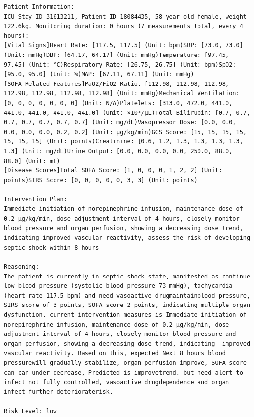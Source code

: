 \documentclass{article}
\begin{document}
\begin{lstlisting}[caption={Result for Patient 31613211}, label={lst:31613211}]
Patient Information:
ICU Stay ID 31613211, Patient ID 18084435, 58-year-old female, weight 122.6kg. Monitoring duration: 0 hours (7 measurements total, every 4 hours):
[Vital Signs]Heart Rate: [117.5, 117.5] (Unit: bpm)SBP: [73.0, 73.0] (Unit: mmHg)DBP: [64.17, 64.17] (Unit: mmHg)Temperature: [97.45, 97.45] (Unit: °C)Respiratory Rate: [26.75, 26.75] (Unit: bpm)SpO2: [95.0, 95.0] (Unit: %)MAP: [67.11, 67.11] (Unit: mmHg)
[SOFA Related Features]PaO2/FiO2 Ratio: [112.98, 112.98, 112.98, 112.98, 112.98, 112.98, 112.98] (Unit: mmHg)Mechanical Ventilation: [0, 0, 0, 0, 0, 0, 0] (Unit: N/A)Platelets: [313.0, 472.0, 441.0, 441.0, 441.0, 441.0, 441.0] (Unit: ×10³/μL)Total Bilirubin: [0.7, 0.7, 0.7, 0.7, 0.7, 0.7, 0.7] (Unit: mg/dL)Vasopressor Dose: [0.0, 0.0, 0.0, 0.0, 0.0, 0.2, 0.2] (Unit: μg/kg/min)GCS Score: [15, 15, 15, 15, 15, 15, 15] (Unit: points)Creatinine: [0.6, 1.2, 1.3, 1.3, 1.3, 1.3, 1.3] (Unit: mg/dL)Urine Output: [0.0, 0.0, 0.0, 0.0, 250.0, 88.0, 88.0] (Unit: mL)
[Disease Scores]Total SOFA Score: [1, 0, 0, 0, 1, 2, 2] (Unit: points)SIRS Score: [0, 0, 0, 0, 0, 3, 3] (Unit: points)

Intervention Plan:
Immediate initiation of norepinephrine infusion, maintenance dose of 0.2 μg/kg/min, dose adjustment interval of 4 hours, closely monitor blood pressure and organ perfusion, showing a decreasing dose trend, indicating improved vascular reactivity, assess the risk of developing septic shock within 8 hours

Reasoning:
The patient is currently in septic shock state, manifested as continue low blood pressure (systolic blood pressure 73 mmHg), tachycardia (heart rate 117.5 bpm) and need vasoactive drugmaintainblood pressure, SIRS score of 3 points, SOFA score 2 points, indicating multiple organ dysfunction. current intervention measures is Immediate initiation of norepinephrine infusion, maintenance dose of 0.2 μg/kg/min, dose adjustment interval of 4 hours, closely monitor blood pressure and organ perfusion, showing a decreasing dose trend, indicating  improved vascular reactivity. Based on this, expected Next 8 hours blood pressurewill gradually stabilize, organ perfusion improve, SOFA score can can under decrease, Predicted is improvetrend. but need alert to infect not fully controlled, vasoactive drugdependence and organ infect further deterioraterisk.

Risk Level: low
\end{lstlisting}
\end{document}
